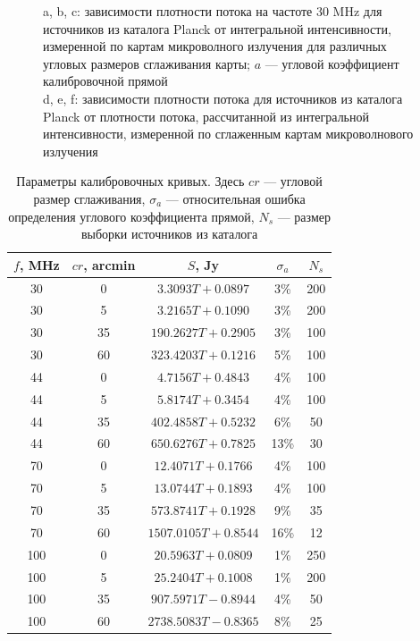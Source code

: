 \documentclass[12pt,a4paper]{extarticle}
\begin{document}
\begin{figure}[h!]
\begin{tabular}{ccc}
		\end{tabular}
		\caption{a, b, c: зависимости плотности потока на частоте $30$ MHz для источников из каталога Planck от интегральной интенсивности, измеренной по картам микроволного излучения для различных угловых размеров сглаживания карты; $a$ --- угловой коэффициент калибровочной прямой\\ d, e, f: зависимости плотности потока для источников из каталога Planck от плотности потока, рассчитанной из интегральной интенсивности, измеренной по сглаженным картам микроволнового излучения}
		\label{calib_corr_030_conv}
	\end{figure}

\begin{table}[h!]
	\setcaptionmargin{0mm}
	\caption{Параметры калибровочных кривых. Здесь $cr$ --- угловой размер сглаживания, $\sigma_a$ --- относительная ошибка определения углового коэффициента прямой, $N_s$ --- размер выборки источников из каталога}
	\label{tab:calib}
	\medskip
	\begin{tabular}{c|c|c|c|c}
		$f$, MHz & $cr$, arcmin & $S$, Jy & $\sigma_a$ & $N_s$\\[3 pt] \hline
		30 & 0 & $3.3093T+0.0897$ & 3\% & 200\\[3 pt]
		30 & 5 & $3.2165T+0.1090$ & 3\% & 200\\[3 pt]
		30 & 35 & $190.2627T+0.2905$ & 3\% & 100\\[3 pt]
		30 & 60 & $323.4203T+0.1216$ & 5\% & 100\\[3 pt]
		44 & 0 & $4.7156T+0.4843$ & 4\% & 100\\[3 pt]
		44 & 5 & $5.8174T+0.3454$ & 4\% & 100\\[3 pt]
		44 & 35 & $402.4858T+0.5232$ & 6\% & 50\\[3 pt]
		44 & 60 & $650.6276T+0.7825$ & 13\% & 30\\[3 pt]
		70 & 0 & $12.4071T+0.1766$ & 4\% & 100\\[3 pt]
		70 & 5 & $13.0744T+0.1893$ & 4\% & 100\\[3 pt]
		70 & 35 & $573.8741T+0.1928$& 9\% & 35\\[3 pt]
		70 & 60 & $1507.0105T+0.8544$ & 16\% & 12\\[3 pt]
		100 & 0 & $20.5963T+0.0809$ & 1\% & 250\\[3 pt]
		100 & 5 & $25.2404T+0.1008$ & 1\% & 200\\[3 pt]
		100 & 35 & $907.5971T-0.8944$ & 4\% & 50\\[3 pt]
		100 & 60 & $2738.5083T-0.8365$ & 8\% & 25\\[3 pt]

\end{tabular}
\end{table}
\end{document}
